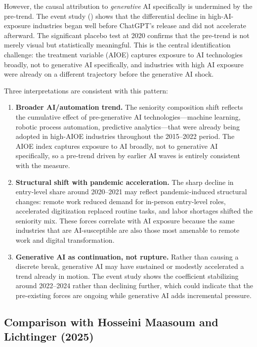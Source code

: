 \documentclass[12pt]{article}
\begin{document}
However, the causal attribution to \emph{generative} AI specifically is undermined by the pre-trend. The event study () shows that the differential decline in high-AI-exposure industries began well before ChatGPT's release and did not accelerate afterward. The significant placebo test at 2020 confirms that the pre-trend is not merely visual but statistically meaningful. This is the central identification challenge: the treatment variable (AIOE) captures exposure to AI technologies broadly, not to generative AI specifically, and industries with high AI exposure were already on a different trajectory before the generative AI shock.

Three interpretations are consistent with this pattern:

\begin{enumerate}
\item \textbf{Broader AI/automation trend.} The seniority composition shift reflects the cumulative effect of pre-generative AI technologies---machine learning, robotic process automation, predictive analytics---that were already being adopted in high-AIOE industries throughout the 2015--2022 period. The AIOE index captures exposure to AI broadly, not to generative AI specifically, so a pre-trend driven by earlier AI waves is entirely consistent with the measure.

\item \textbf{Structural shift with pandemic acceleration.} The sharp decline in entry-level share around 2020--2021 may reflect pandemic-induced structural changes: remote work reduced demand for in-person entry-level roles, accelerated digitization replaced routine tasks, and labor shortages shifted the seniority mix. These forces correlate with AI exposure because the same industries that are AI-susceptible are also those most amenable to remote work and digital transformation.

\item \textbf{Generative AI as continuation, not rupture.} Rather than causing a discrete break, generative AI may have sustained or modestly accelerated a trend already in motion. The event study shows the coefficient stabilizing around 2022--2024 rather than declining further, which could indicate that the pre-existing forces are ongoing while generative AI adds incremental pressure.
\end{enumerate}

\subsection{Comparison with Hosseini Maasoum and Lichtinger (2025)}
\end{document}
